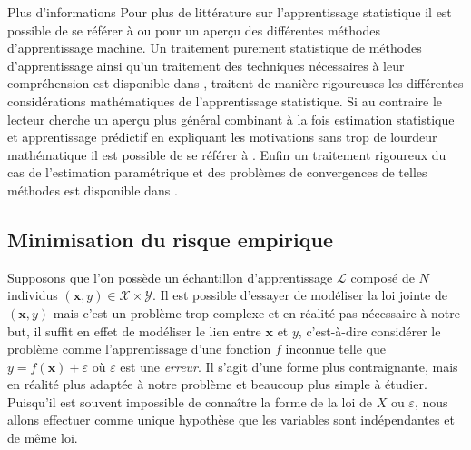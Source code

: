 \begin{remark}{Plus d'informations}
    Pour plus de littérature sur l'apprentissage statistique il est possible de se référer à \citet{Trevor} ou \citet{Bishop2006} pour un aperçu des différentes méthodes d'apprentissage machine. Un traitement purement statistique de méthodes d'apprentissage ainsi qu'un traitement des techniques nécessaires à leur compréhension est disponible dans \citet{Wasserman2004}, \citet{Devroye1997} traitent de manière rigoureuses les différentes considérations mathématiques de l'apprentissage statistique. Si au contraire le lecteur cherche un aperçu plus général combinant à la fois estimation statistique et apprentissage prédictif en expliquant les motivations sans trop de lourdeur mathématique il est possible de se référer à \citet{Cherkassky2007}.
    Enfin un traitement rigoureux du cas de l'estimation paramétrique et des problèmes de convergences de telles méthodes est disponible dans \citet{Tsybakov2009}.
\end{remark}

\subsection{Minimisation du risque empirique}

Supposons que l'on possède un échantillon d'apprentissage $\mathcal{L}$ composé de $N$ individus $(\mathbf{x},y) \in \mathcal{X} \times \mathcal{Y}$. Il est possible d'essayer de modéliser la loi jointe de $(\mathbf{x},y)$ mais c'est un problème trop complexe et en réalité pas nécessaire à notre but, il suffit en effet de modéliser le lien entre $\mathbf{x}$ et $y$, c'est-à-dire considérer le problème comme l'apprentissage d'une fonction $f$ inconnue telle que $y = f (\mathbf{x}) + \varepsilon$ où $\varepsilon$ est une \emph{erreur}. Il s'agit d'une forme plus contraignante, mais en réalité plus adaptée à notre problème et beaucoup plus simple à étudier. Puisqu'il est souvent impossible de connaître la forme de la loi de $X$ ou $\varepsilon$, nous allons effectuer comme unique hypothèse que les variables sont indépendantes et de même loi.


